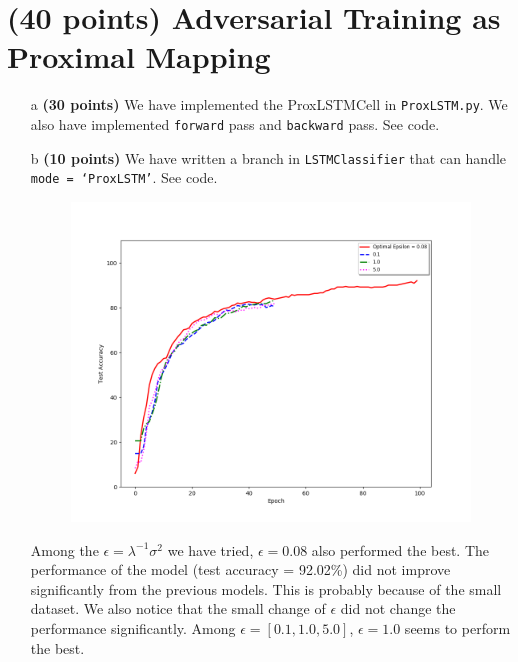 \documentclass[11pt]{report}
\begin{document}
\section{(40 points) Adversarial Training as Proximal Mapping}
\begin{itemize}
    \item[a] \textbf{(30 points)} We have implemented the ProxLSTMCell in \texttt{ProxLSTM.py}. We also have implemented \texttt{forward} pass and \texttt{backward} pass. See code. 
    \item[b] \textbf{(10 points)} We have written a branch in \texttt{LSTMClassifier} that can handle \texttt{mode = `ProxLSTM'}. See code. 

    \begin{figure}[h]
        \includegraphics[width = 15 cm]{ProxModel.png}
        \centering
    \end{figure}

    Among the $\epsilon = \lambda^{-1}\sigma^2$ we have tried, $\epsilon = 0.08$ also performed the best. The performance of the model (test accuracy = 92.02\%) did not improve significantly from the previous models. 
    This is probably because of the small dataset.  
    We also notice that the small change of $\epsilon$ did not change the performance significantly. 
    Among $\epsilon = [0.1, 1.0, 5.0]$, $\epsilon = 1.0$ seems to perform the best. 


\end{itemize}
\end{document}
